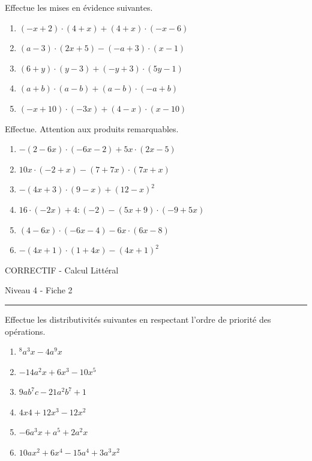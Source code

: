 \documentclass[12pt,parskip=half-, twoside=semi]{scrartcl}
\begin{document}
\begin{exercise}Effectue les mises en évidence suivantes.
  \begin{enumerate}[cols=2]
      \item $(-x+2) \cdot(4+x)+(4+x) \cdot(-x-6)$
      \item $(a-3) \cdot(2 x+5)-(-a+3) \cdot(x-1)$
      \item $(6+y) \cdot(y-3)+(-y+3) \cdot(5 y-1)$
      \item $(a+b) \cdot(a-b)+(a-b) \cdot(-a+b)$
      \item $(-x+10) \cdot(-3 x)+(4-x) \cdot(x-10)$
  \end{enumerate}
\end{exercise}

\begin{exercise}Effectue. Attention aux produits remarquables.
  \begin{enumerate}
      \item $-(2-6 x) \cdot(-6 x-2)+5 x \cdot(2 x-5)$
      \item $10 x \cdot(-2+x)-(7+7 x) \cdot(7 x+x)$
      \item $-(4 x+3) \cdot(9-x)+(12-x)^2$
      \item $16 \cdot(-2 x)+4:(-2)-(5 x+9) \cdot(-9+5 x)$
      \item $(4-6 x) \cdot(-6 x-4)-6 x \cdot(6 x-8)$
      \item $-(4 x+1) \cdot(1+4 x)-(4 x+1)^2$
  \end{enumerate}
\end{exercise}

\newpage
\begin{center}
  \bfseries
  \begin{Huge}
    CORRECTIF - Calcul Littéral
  \end{Huge}
  \smallbreak
  \begin{large}
    Niveau 4  - Fiche 2
  \end{large}
  \smallbreak
  \rule[10pt]{.5\linewidth}{1 pt}
\end{center}
 
\setcounter{exercise}{0}

\begin{exercise}Effectue les distributivités suivantes en respectant l'ordre de priorité des opérations.
  \begin{enumerate} [cols=2]
      \item $^8a^3x-4a^9x$
      \item $-14a^2x+6x^3-10x^5$
      \item $9ab^7c-21a^2b^7+1$
      \item $4x4+12x^3-12x^2$
      \item $-6a^3x+a^5+2a^2x$
      \item $10ax^2+6x^4-15a^4+3a^3x^2$
  \end{enumerate}
\end{exercise}
\end{document}

